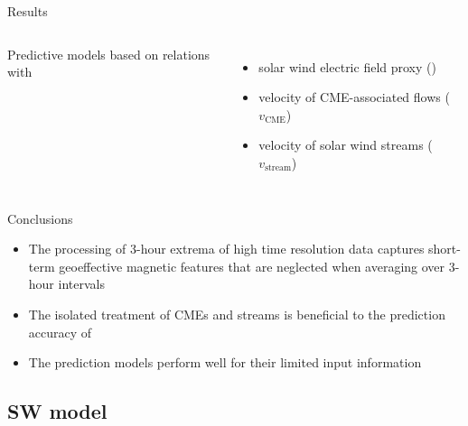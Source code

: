 \begin{frame}[plain,c]{Results}{}
	\begin{columns}[c]
	\column{\textwidth}
		
		Predictive \Kp{} models based on relations with
		\begin{itemize}%
			\item solar wind electric field proxy (\vBz{})
			\item velocity of CME-associated flows ($v_\text{CME}$)
			\item velocity of solar wind streams ($v_\text{stream}$)
		\end{itemize}
		
	\end{columns}
\end{frame}
\begin{frame}[plain,c]{Conclusions}{}
		
		\begin{itemize}%
			\item The processing of 3-hour extrema of high time resolution data captures short-term geoeffective magnetic features that are neglected when averaging over 3-hour intervals
			\item The isolated treatment of CMEs and streams is beneficial to the prediction accuracy of \Kp{}
			\item The prediction models perform well for their limited input information
		\end{itemize}
		
	
	\vspace*{\fill} \hfill \hyperlink{prediction_performance}{}
\end{frame}


\subsection{SW model}

